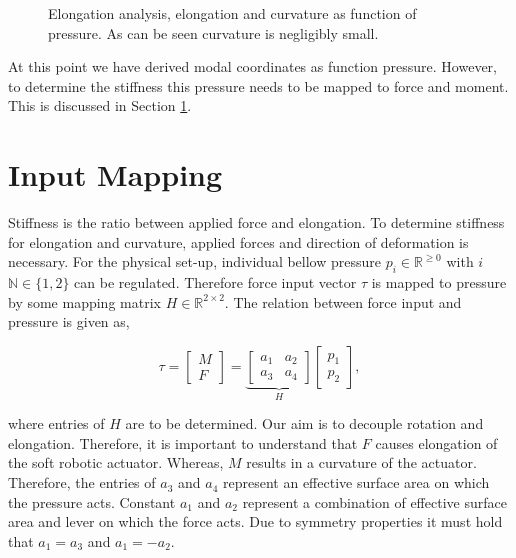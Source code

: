 \begin{figure}[H]
\begin{minipage}{0.5\textwidth}
        \caption{Elongation analysis, elongation and curvature as function of pressure. As can be seen curvature is negligibly small.}
        \label{fig3:elongationvspressure}
    \end{minipage}
\end{figure}

\newpage


At this point we have derived modal coordinates as function pressure. However, to determine the stiffness this pressure needs to be mapped to force and moment. This is discussed in Section \ref{sec3:InputMapping}.







\section{Input Mapping}
\label{sec3:InputMapping}

Stiffness is the ratio between applied force and elongation. To determine stiffness for elongation and curvature, applied forces and direction of deformation is necessary. For the physical set-up, individual bellow pressure $p_i \in \mathbb{R}^{\geq 0}$ with $i$ $\mathbb{N} \in \{1,2\}$ can be regulated. Therefore force input vector $\tau$ is mapped to pressure by some mapping matrix $H \in \mathbb{R}^{2 \times 2}$. The relation between force input and pressure is given as, 

\begin{equation}
   \tau =   \begin{bmatrix} M \\ F \end{bmatrix}     = \underbrace{\begin{bmatrix}  a_1 & a_2 \\ a_3 & a_4 \end{bmatrix}}_{H}         \begin{bmatrix}  p_1 \\ p_2 \end{bmatrix}, \label{eq3:H}
\end{equation}

where entries of $H$ are to be determined. Our aim is to decouple rotation and elongation. Therefore, it is important to understand that $F$ causes elongation of the soft robotic actuator. Whereas, $M$ results in a curvature of the actuator. Therefore, the entries of $a_3$ and $a_4$ represent an effective surface area on which the pressure acts. Constant $a_1$ and $a_2$ represent a combination of effective surface area and lever on which the force acts. Due to symmetry properties it must hold that $a_1 = a_3$ and $a_1 = -a_2$.

